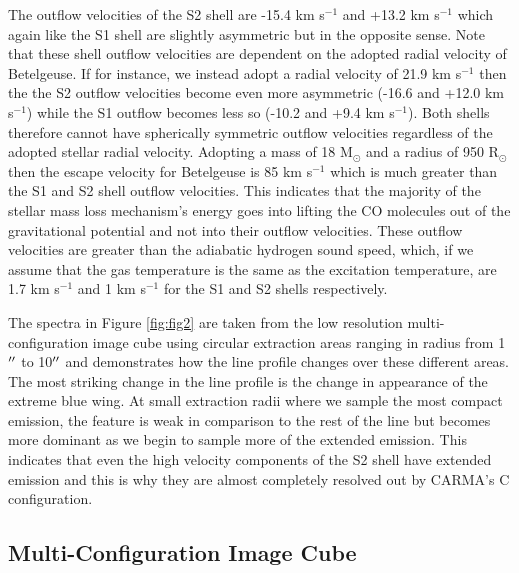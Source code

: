 \documentclass[iop]{emulateapj}
\begin{document}
The outflow velocities of the S2 shell are -15.4 km s${}^{-1}$ and +13.2 km s${}^{-1}$ which again like the S1 shell are slightly asymmetric but in the opposite sense. Note that these shell outflow velocities are dependent on the adopted radial velocity of Betelgeuse. If for instance, we instead adopt a radial velocity of 21.9 km s${}^{-1}$ \citep{2005A&A...430..165F} then the the S2 outflow velocities become even more asymmetric (-16.6 and +12.0 km s${}^{-1}$) while the S1 outflow becomes less so (-10.2 and +9.4 km s${}^{-1}$). Both shells therefore cannot have spherically symmetric outflow velocities regardless of the adopted stellar radial velocity. Adopting a mass of 18 M$_{\odot}$ and a radius of 950 R$_{\odot}$ \citep{2008AJ....135.1430H} then the escape velocity for Betelgeuse is 85 km s${}^{-1}$ which is much greater than the S1 and S2 shell outflow velocities. This indicates that the majority of the stellar mass loss mechanism's energy goes into lifting the CO molecules out of the gravitational potential and not into their outflow velocities. These outflow velocities are greater than the adiabatic hydrogen sound speed, which, if we assume that the gas temperature is the same as the excitation temperature, are 1.7 km s${}^{-1}$ and 1 km s${}^{-1}$ for the S1 and S2 shells respectively. 

The spectra in Figure \ref{fig:fig2} are taken from the low resolution multi-configuration image cube using circular extraction areas ranging in radius from 1$\mbox{$^{\prime\prime}$}$ to 10$\mbox{$^{\prime\prime}$}$ and demonstrates how the line profile changes over these different areas. The most striking change in the line profile is the change in appearance of the extreme blue wing. At small extraction radii where we sample the most compact emission, the feature is weak in comparison to the rest of the line but becomes more dominant as we begin to sample more of the extended emission. This indicates that even the high velocity components of the S2 shell have extended emission and this is why they are almost completely resolved out by CARMA's C configuration.

\subsection{Multi-Configuration Image Cube} \label{results2} 
\end{document}
